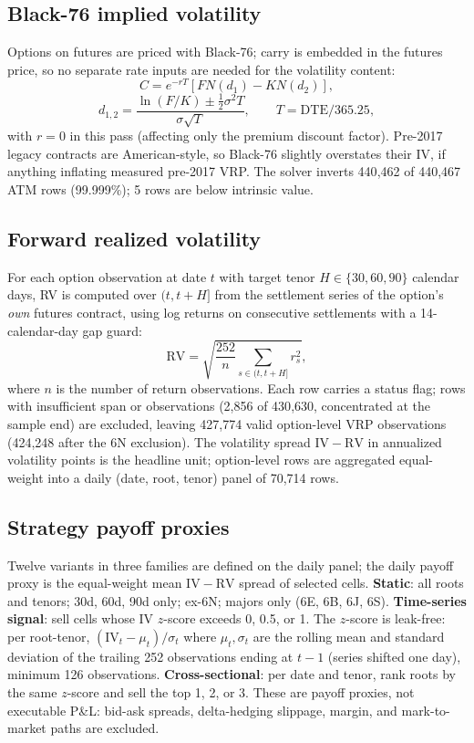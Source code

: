 \documentclass[10pt,twocolumn]{article}
\begin{document}
\subsection{Black-76 implied volatility}
Options on futures are priced with Black-76; carry is embedded in the futures price, so no separate rate inputs are needed for the volatility content:
\begin{equation}
C = e^{-rT}\left[F N(d_1) - K N(d_2)\right],
\end{equation}
\begin{equation}
d_{1,2} = \frac{\ln(F/K) \pm \tfrac{1}{2}\sigma^2 T}{\sigma\sqrt{T}},
\qquad T = \mathrm{DTE}/365.25,
\end{equation}
with $r=0$ in this pass (affecting only the premium discount factor). Pre-2017 legacy contracts are American-style, so Black-76 slightly overstates their IV, if anything inflating measured pre-2017 VRP. The solver inverts 440{,}462 of 440{,}467 ATM rows (99.999\%); 5 rows are below intrinsic value.

\subsection{Forward realized volatility}
For each option observation at date $t$ with target tenor $H \in \{30,60,90\}$ calendar days, RV is computed over $(t, t+H]$ from the settlement series of the option's \emph{own} futures contract, using log returns on consecutive settlements with a 14-calendar-day gap guard:
\begin{equation}
\mathrm{RV} = \sqrt{\frac{252}{n}\sum_{s \in (t,t+H]} r_s^2},
\end{equation}
where $n$ is the number of return observations. Each row carries a status flag; rows with insufficient span or observations (2{,}856 of 430{,}630, concentrated at the sample end) are excluded, leaving 427{,}774 valid option-level VRP observations (424{,}248 after the 6N exclusion). The volatility spread $\mathrm{IV}-\mathrm{RV}$ in annualized volatility points is the headline unit; option-level rows are aggregated equal-weight into a daily (date, root, tenor) panel of 70{,}714 rows.

\subsection{Strategy payoff proxies}
\label{sec:strat}
Twelve variants in three families are defined on the daily panel; the daily payoff proxy is the equal-weight mean $\mathrm{IV}-\mathrm{RV}$ spread of selected cells.
\textbf{Static}: all roots and tenors; 30d, 60d, 90d only; ex-6N; majors only (6E, 6B, 6J, 6S).
\textbf{Time-series signal}: sell cells whose IV $z$-score exceeds 0, 0.5, or 1. The $z$-score is leak-free: per root-tenor, $(\mathrm{IV}_t - \mu_{t})/\sigma_{t}$ where $\mu_t,\sigma_t$ are the rolling mean and standard deviation of the trailing 252 observations ending at $t-1$ (series shifted one day), minimum 126 observations.
\textbf{Cross-sectional}: per date and tenor, rank roots by the same $z$-score and sell the top 1, 2, or 3.
These are payoff proxies, not executable P\&L: bid-ask spreads, delta-hedging slippage, margin, and mark-to-market paths are excluded.
\end{document}
